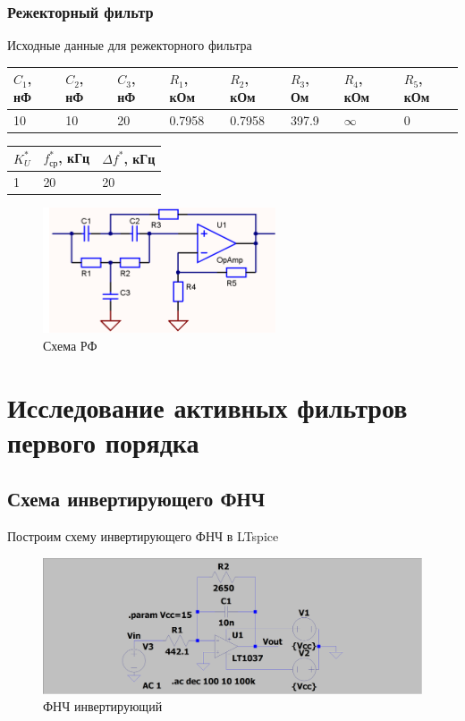 \documentclass[a4paper, 12pt]{article}
\begin{document}
    \subsubsection{Режекторный фильтр}
    Исходные данные для режекторного фильтра
    \begin{center}
        \begin{tabular}{ | m{3.5em} | m{3.5em}| m{3.5em} | m{4em} | m{4em} | m{3.5em} | m{4em} | m{4em} |} 
        \hline
        $C_1$, нФ&$C_2$, нФ&$C_3$, нФ&$R_1$, кОм&$R_2$, кОм&$R_3$, Ом &$R_4$, кОм&$R_5$, кОм\\ 
        \hline
        10&10&20&0.7958&0.7958&397.9&$\infty$&0\\ 
        \hline
        \end{tabular}
    \end{center}
    \begin{center}
        \begin{tabular}{ | m{3.5em} | m{3.5em}| m{4.5em} |} 
        \hline
        $K_U^*$&$f_\text{ср}^*$, кГц&$\Delta f^*$, кГц\\ 
        \hline
        1&20&20\\ 
        \hline
        \end{tabular}
    \end{center}
    \begin{figure}[H]
        \centering
        \includegraphics{rectoring.png}
        \captionsetup{skip=0pt}
        \caption{Схема РФ}
        \label{fig:null_scheme5}
    \end{figure}


    \section{Исследование активных фильтров первого порядка}
    \subsection{Схема инвертирующего ФНЧ}
    Построим схему инвертирующего ФНЧ в LTspice
    \begin{figure}[H]
        \centering
        \includegraphics[scale=0.22]{scheme1.png}
        \captionsetup{skip=0pt}
        \caption{ФНЧ инвертирующий}
        \label{fig:scheme1}
    \end{figure}
\end{document}
